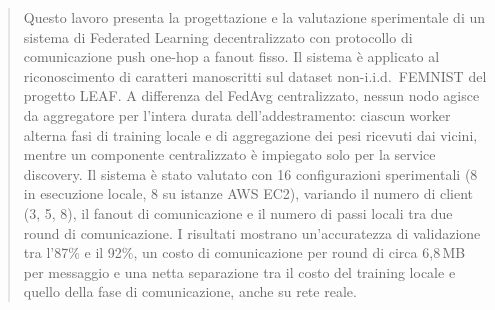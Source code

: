 \begin{abstract}
Questo lavoro presenta la progettazione e la valutazione sperimentale di un
sistema di Federated Learning decentralizzato con protocollo di comunicazione push
one-hop a fanout fisso. Il sistema è applicato al
riconoscimento di caratteri manoscritti sul dataset non-i.i.d.\ FEMNIST del
progetto LEAF. A differenza del FedAvg centralizzato, nessun nodo
agisce da aggregatore per l'intera durata dell'addestramento: ciascun worker
alterna fasi di training locale e di aggregazione dei pesi ricevuti
dai vicini, mentre un componente centralizzato è impiegato solo per
la service discovery. Il sistema è stato valutato con 16 configurazioni
sperimentali (8 in esecuzione locale, 8 su istanze AWS EC2), variando il numero
di client (3, 5, 8), il fanout di comunicazione e il
numero di passi locali tra due round di comunicazione. I risultati mostrano
un'accuratezza di validazione tra l'87\% e il 92\%, un costo di comunicazione
per round di circa 6,8\,MB per messaggio e una netta separazione tra il costo
del training locale e quello della fase di comunicazione, anche su rete reale.
\end{abstract}
